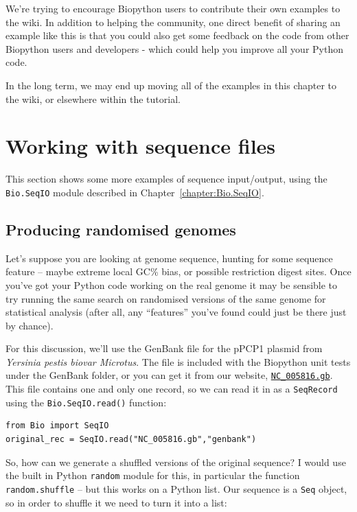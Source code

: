 \documentclass{report}
\begin{document}
We're trying to encourage Biopython users to contribute their own examples
to the wiki. In addition to helping the community, one direct benefit of
sharing an example like this is that you could also get some feedback on
the code from other Biopython users and developers - which could help you
improve all your Python code.

In the long term, we may end up moving all of the examples in this chapter
to the wiki, or elsewhere within the tutorial.

\section{Working with sequence files}
\label{seq:cookbook-sequences}

This section shows some more examples of sequence input/output, using the
\verb|Bio.SeqIO| module described in Chapter~\ref{chapter:Bio.SeqIO}.

\subsection{Producing randomised genomes}

Let's suppose you are looking at genome sequence, hunting for some sequence
feature -- maybe extreme local GC\% bias, or possible restriction digest sites.
Once you've got your Python code working on the real genome it may be sensible
to try running the same search on randomised versions of the same genome for
statistical analysis (after all, any ``features'' you've found could just be
there just by chance).

For this discussion, we'll use the GenBank file for the pPCP1 plasmid from
\textit{Yersinia pestis biovar Microtus}.  The file is included with the
Biopython unit tests under the GenBank folder, or you can get it from our
website, \href{http://biopython.org/SRC/biopython/Tests/GenBank/NC_005816.gb}
{\texttt{NC\_005816.gb}}.  
This file contains one and only one record, so we can read it in as a
\verb|SeqRecord| using the \verb|Bio.SeqIO.read()| function:

\begin{verbatim}
from Bio import SeqIO
original_rec = SeqIO.read("NC_005816.gb","genbank")
\end{verbatim}

So, how can we generate a shuffled versions of the original sequence?  I would
use the built in Python \verb|random| module for this, in particular the function
\verb|random.shuffle| -- but this works on a Python list.  Our sequence is a
\verb|Seq| object, so in order to shuffle it we need to turn it into a list:
\end{document}
